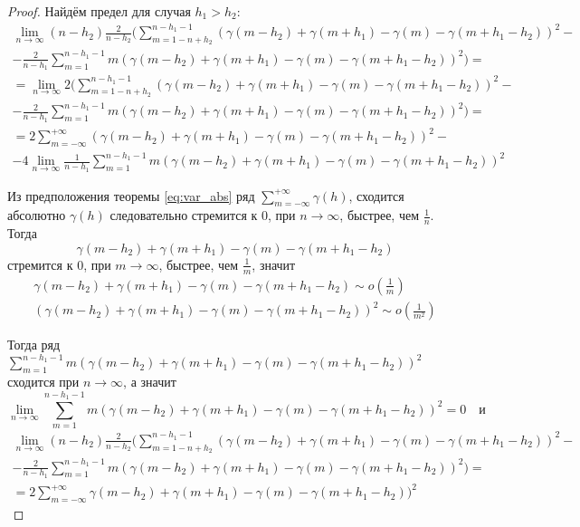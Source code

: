 \begin{proof}
Найдём предел для случая $ h_1 > h_2 $:
\begin{multline*}
		\lim_{n \to \infty} (n - h_2) \frac{2}{n - h_2}(\sum_{m = 1 - n + h_2}^{n - h_1 - 1} (\gamma(m - h_2) + \gamma(m + h_1) - \gamma(m) - \gamma(m + h_1 - h_2))^2 - \\
		- \frac{2}{n - h_1} \sum_{m = 1}^{n - h_1 - 1} m (\gamma(m - h_2) + \gamma(m + h_1) - \gamma(m) - \gamma(m + h_1 - h_2))^2) =  \\
		= \lim_{n \to \infty} 2(\sum_{m = 1 - n + h_2}^{n - h_1 - 1} (\gamma(m - h_2) + \gamma(m + h_1) - \gamma(m) - \gamma(m + h_1 - h_2))^2 - \\
		- \frac{2}{n - h_1} \sum_{m = 1}^{n - h_1 - 1} m (\gamma(m - h_2) + \gamma(m + h_1) - \gamma(m) - \gamma(m + h_1 - h_2))^2) = \\
		= 2 \sum_{m = -\infty}^{+\infty} (\gamma(m - h_2) + \gamma(m + h_1) - \gamma(m) - \gamma(m + h_1 - h_2))^2 - \\
		- 4 \lim_{n \to \infty} \frac{1}{n - h_1} \sum_{m = 1}^{n - h_1 - 1} m (\gamma(m - h_2) + \gamma(m + h_1) - \gamma(m) - \gamma(m + h_1 - h_2))^2
\end{multline*}

Из предположения теоремы \eqref{eq:var_abs} ряд $ \sum\limits_{m = -\infty}^{+\infty} \gamma(h) $, сходится абсолютно $ \gamma(h) $ следовательно стремится к $ 0 $, при $ n \to \infty $, быстрее, чем $ \frac{1}{n} $. Тогда
$$ \gamma(m - h_2) + \gamma(m + h_1) - \gamma(m) - \gamma(m + h_1 - h_2) $$
стремится к $ 0 $, при $ m \to \infty $, быстрее, чем $\frac{1}{m}$, значит
\begin{align*}
	\gamma(m - h_2) + \gamma(m + h_1) - \gamma(m) - \gamma(m + h_1 - h_2) \sim o(\frac{1}{m}) \\
	(\gamma(m - h_2) + \gamma(m + h_1) - \gamma(m) - \gamma(m + h_1 - h_2))^2 \sim o(\frac{1}{m^2})
\end{align*}

Тогда ряд $ \sum\limits_{m = 1}^{n - h_1 - 1} m (\gamma(m - h_2) + \gamma(m + h_1) - \gamma(m) - \gamma(m + h_1 - h_2))^2 $ сходится при $ n \to \infty $, а значит
\begin{equation*}
	\lim_{n \to \infty} \sum_{m = 1}^{n - h_1 - 1} m (\gamma(m - h_2) + \gamma(m + h_1) - \gamma(m) - \gamma(m + h_1 - h_2))^2 = 0 \quad \text{и}
\end{equation*}
\begin{align}
\nonumber
	\lim_{n \to \infty} (n - h_2) \frac{2}{n - h_2}(\sum_{m = 1 - n + h_2}^{n - h_1 - 1} (\gamma(m - h_2) + \gamma(m + h_1) - \gamma(m) - \gamma(m + h_1 - h_2))^2 - \\ \nonumber
	- \frac{2}{n - h_1} \sum_{m = 1}^{n - h_1 - 1} m (\gamma(m - h_2) + \gamma(m + h_1) - \gamma(m) - \gamma(m + h_1 - h_2))^2) = \\
	= 2 \sum_{m = -\infty}^{+\infty} \gamma(m - h_2) + \gamma(m + h_1) - \gamma(m) - \gamma(m + h_1 - h_2))^2
\label{eq:asyfirst}
\end{align}


\end{proof}
